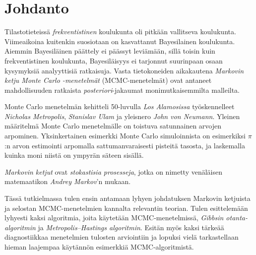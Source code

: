 \chapter{Johdanto}\label{johd}

Tilastotieteissä \textit{frekventistinen} koulukunta oli pitkään vallitseva koulukunta. Viimeaikoina kuitenkin suosiotaan on kasvattanut Bayesilainen koulukunta. Aiemmin Bayesiläinen päättely ei päässyt leviämään, sillä toisin kuin frekventistinen koulukunta, Bayesiläisyys ei tarjonnut suurinpaan osaan kysymyksiä analyyttisiä ratkaisuja. Vasta tietokoneiden aikakautena \textit{Markovin ketju Monte Carlo -menetelmät} (MCMC-menetelmät) ovat antaneet mahdollisuuden ratkaista \textit{posteriori}-jakaumat monimutkaisemmilta malleilta.

Monte Carlo menetelmän kehitteli 50-luvulla \textit{Los Alamosissa} työskennelleet \textit{Nicholas Metropolis}, \textit{Stanislav Ulam} ja yleisnero \textit{John von Neumann}. Yleinen määritelmä Monte Carlo menetelmälle on toistuva satunnainen arvojen arpominen. Yksinkertainen esimerkki Monte Carlo simuloinnista on esimerkiksi $\pi$:n arvon estimointi arpomalla sattumanvaraisesti pisteitä tasosta, ja laskemalla kuinka moni niistä on ympyrän säteen sisällä. 

\textit{Markovin ketjut} ovat \textit{stokastisia prosesseja}, jotka on nimetty venäläisen matemaatikon \textit{Andrey Markov}'n mukaan. 

Tässä tutkielmassa tulen ensin antamaan lyhyen johdatuksen Markovin ketjuista ja selostan MCMC-menetelmien kannalta relevantin teorian. Tulen esittelemään lyhyesti kaksi algoritmia, joita käytetään MCMC-menetelmissä, \textit{Gibbsin otanta-algoritmin} ja \textit{Metropolis–Hastings algoritmin}. Esitän myös kaksi tärkeää diagnostiikkaa menetelmien tulosten arviointiin ja lopuksi vielä tarkastellaan hieman laajempaa käytännön esimerkkiä MCMC-algoritmistä.
